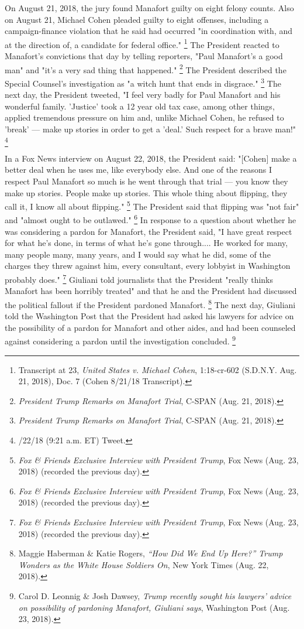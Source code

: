 {On August 21, 2018, the jury found Manafort guilty on eight felony counts.
Also on August 21, Michael Cohen pleaded guilty to eight offenses, including a campaign-finance violation that he said had occurred "in coordination with, and at the direction of, a candidate for federal office."%
\footnote{Transcript at 23, \textit{United States v. Michael Cohen}, 1:18-cr-602 (S.D.N.Y. Aug. 21, 2018), Doc. 7 (Cohen 8/21/18 Transcript).}
The President reacted to Manafort's convictions that day by telling reporters, "Paul Manafort's a good man" and "it's a very sad thing that happened."%
\footnote{\textit{President Trump Remarks on Manafort Trial}, C-SPAN (Aug. 21, 2018).}
The President described the Special Counsel's investigation as "a witch hunt that ends in disgrace."%
\footnote{\textit{President Trump Remarks on Manafort Trial}, C-SPAN (Aug. 21, 2018).}
The next day, the President tweeted, "I feel very badly for Paul Manafort and his wonderful family.
'Justice' took a 12 year old tax case, among other things, applied tremendous pressure on him and, unlike Michael Cohen, he refused to 'break' — make up stories in order to get a 'deal.'
Such respect for a brave man!"%
\footnote{/22/18 (9:21 a.m. ET) Tweet.}

In a Fox News interview on August 22, 2018, the President said: "[Cohen] make a better deal when he uses me, like everybody else.
And one of the reasons I respect Paul Manafort so much is he went through that trial — you know they make up stories.
People make up stories.
This whole thing about flipping, they call it, I know all about flipping."%
\footnote{\textit{Fox \& Friends Exclusive Interview with President Trump}, Fox News (Aug. 23, 2018) (recorded the previous day).}
The President said that flipping was "not fair" and "almost ought to be outlawed."%
\footnote{\textit{Fox \& Friends Exclusive Interview with President Trump}, Fox News (Aug. 23, 2018) (recorded the previous day).}
In response to a question about whether he was considering a pardon for Manafort, the President said, "I have great respect for what he's done, in terms of what he's gone through....
He worked for many, many people many, many years, and I would say what he did, some of the charges they threw against him, every consultant, every lobbyist in Washington probably does."%
\footnote{\textit{Fox \& Friends Exclusive Interview with President Trump}, Fox News (Aug. 23, 2018) (recorded the previous day).}
Giuliani told journalists that the President "really thinks Manafort has been horribly treated" and that he and the President had discussed the political fallout if the President pardoned Manafort.%
\footnote{Maggie Haberman \& Katie Rogers, \textit{“How Did We End Up Here?” Trump Wonders as the White House Soldiers On}, New York Times (Aug. 22, 2018).}
The next day, Giuliani told the Washington Post that the President had asked his lawyers for advice on the possibility of a pardon for Manafort and other aides, and had been counseled against considering a pardon until the investigation concluded.%
\footnote{Carol D. Leonnig \& Josh Dawsey, \textit{Trump recently sought his lawyers’ advice on possibility of pardoning Manafort, Giuliani says}, Washington Post (Aug. 23, 2018).}

}
